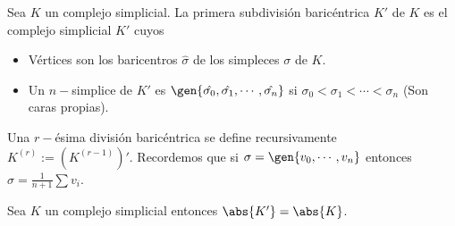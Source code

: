 \documentclass{article}
\begin{document}
\newpage
\begin{dfn}
    Sea $K$ un complejo simplicial. La primera subdivisión baricéntrica $K'$ de $K$ es el complejo
    simplicial $K'$ cuyos
    \begin{itemize}
        \item Vértices son los baricentros $\hat{\sigma}$ de los simpleces $\sigma$ de $K$.
        \item Un $n-$simplice de $K'$ es 
        $\gen{\hat{\sigma_{0}},\hat{\sigma_{1}},\cdots,\hat{\sigma_{n}}}$ si 
        $\sigma_{0}<\sigma_{1}<\cdots<\sigma_{n}$ (Son caras propias).
    \end{itemize}
    Una $r-$ésima división baricéntrica se define recursivamente $K^{(r)}:=(K^{(r-1)})'$.
    Recordemos que si $\sigma=\gen{v_{0},\cdots,v_{n}}$ entonces 
    $\hat{\sigma}=\frac{1}{n+1}\sum v_{i}$.
\end{dfn}

\vspace{2mm}
\begin{prop}
    Sea $K$ un complejo simplicial entonces $\abs{K'}=\abs{K}$.
\end{prop}
\end{document}
